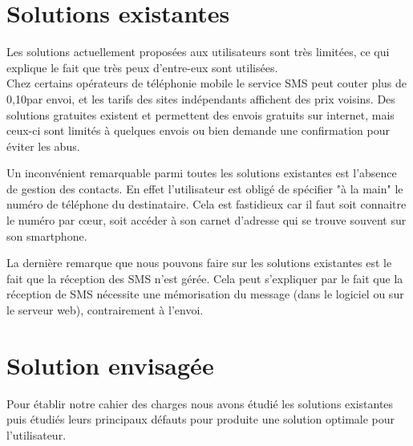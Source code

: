 \section{Solutions existantes}

Les solutions actuellement proposées aux utilisateurs sont très limitées, ce qui explique le fait que très peux d'entre-eux sont utilisées.
\\


Chez certains opérateurs de téléphonie mobile le service SMS peut couter plus de 0,10\texteuro par envoi, et les tarifs des sites indépendants affichent des prix voisins.
Des solutions gratuites existent et permettent des envois gratuits sur internet, mais ceux-ci sont limités à quelques envois ou bien demande une confirmation pour éviter les abus.

Un inconvénient remarquable parmi toutes les solutions existantes est l'absence de gestion des contacts.
En effet l'utilisateur est obligé de spécifier "à la main" le numéro de téléphone du destinataire.
Cela est fastidieux car il faut soit connaitre le numéro par cœur, soit accéder à son carnet d'adresse qui se trouve souvent sur son smartphone.

La dernière remarque que nous pouvons faire sur les solutions existantes est le fait que la réception des SMS n'est gérée.
Cela peut s'expliquer par le fait que la réception de SMS nécessite une mémorisation du message (dans le logiciel ou sur le serveur web), contrairement à l'envoi.






\section{Solution envisagée}

Pour établir notre cahier des charges nous avons étudié les solutions existantes puis étudiés leurs principaux défauts pour produite une solution optimale pour l'utilisateur.
\\


